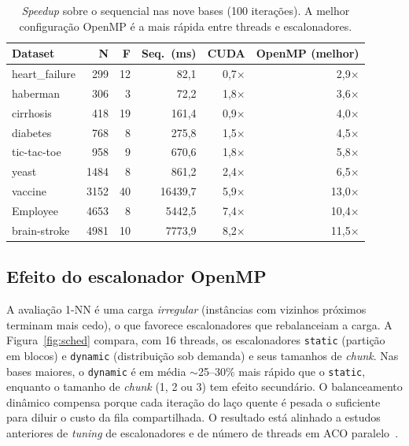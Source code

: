 \documentclass[12pt]{article}
\begin{document}
\begin{table}[ht]
\centering
\caption{\textit{Speedup} sobre o sequencial nas nove bases (100 iterações). A melhor
  configuração OpenMP é a mais rápida entre threads e escalonadores.}
\label{tab:baseline}
\begin{tabular}{lrrrrr}
\hline
\textbf{Dataset} & \textbf{N} & \textbf{F} & \textbf{Seq.\ (ms)} & \textbf{CUDA} & \textbf{OpenMP (melhor)} \\
\hline
heart\_failure & 299  & 12 & 82,1    & 0,7$\times$ & 2,9$\times$ \\
haberman       & 306  & 3  & 72,2    & 1,8$\times$ & 3,6$\times$ \\
cirrhosis      & 418  & 19 & 161,4   & 0,9$\times$ & 4,0$\times$ \\
diabetes       & 768  & 8  & 275,8   & 1,5$\times$ & 4,5$\times$ \\
tic-tac-toe    & 958  & 9  & 670,6   & 1,8$\times$ & 5,8$\times$ \\
yeast          & 1484 & 8  & 861,2   & 2,4$\times$ & 6,5$\times$ \\
vaccine        & 3152 & 40 & 16439,7 & 5,9$\times$ & 13,0$\times$ \\
Employee       & 4653 & 8  & 5442,5  & 7,4$\times$ & 10,4$\times$ \\
brain-stroke   & 4981 & 10 & 7773,9  & 8,2$\times$ & 11,5$\times$ \\
\hline
\end{tabular}
\end{table}

\subsection{Efeito do escalonador OpenMP}

A avaliação 1-NN é uma carga \textit{irregular} (instâncias com vizinhos próximos terminam mais
cedo), o que favorece escalonadores que rebalanceiam a carga. A Figura~\ref{fig:sched} compara,
com 16 threads, os escalonadores \texttt{static} (partição em blocos) e \texttt{dynamic}
(distribuição sob demanda) e seus tamanhos de \textit{chunk}. Nas bases maiores, o
\texttt{dynamic} é em média $\sim$25--30\% mais rápido que o \texttt{static}, enquanto o
tamanho de \textit{chunk} (1, 2 ou 3) tem efeito secundário. O balanceamento dinâmico compensa
porque cada iteração do laço quente é pesada o suficiente para diluir o custo da fila
compartilhada. O resultado está alinhado a estudos anteriores de \textit{tuning} de
escalonadores e de número de threads em ACO paralelo~\cite{abouelfarag2015}.
\end{document}

